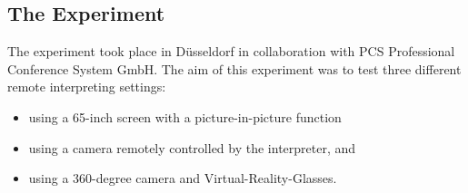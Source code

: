 \documentclass[output=paper]{langsci/langscibook}
\begin{document}
\subsection{The Experiment}

The experiment took place in Düsseldorf in collaboration with PCS Professional Conference System GmbH. The aim of this experiment was to test three different remote interpreting settings: 

\begin{itemize}
\item using a 65-inch screen with a picture-in-picture function 
\item using a camera remotely controlled by the interpreter, and
\item using a 360-degree camera and Virtual-Reality-Glasses. 
\end{itemize}
\end{document}

